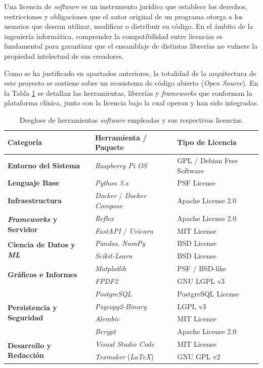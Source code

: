 Una licencia de \textit{software} es un instrumento jurídico que establece los derechos, restricciones y obligaciones que el autor original de un programa otorga a los usuarios que desean utilizar, modificar o distribuir su código. En el ámbito de la ingeniería informática, comprender la compatibilidad entre licencias es fundamental para garantizar que el ensamblaje de distintas librerías no vulnere la propiedad intelectual de sus creadores.

Como se ha justificado en apartados anteriores, la totalidad de la arquitectura de este proyecto se sostiene sobre un ecosistema de código abierto (\textit{Open Source}). En la Tabla \ref{tab:licencias_software} se detallan las herramientas, librerías y \textit{frameworks} que conforman la plataforma clínica, junto con la licencia bajo la cual operan y han sido integradas.

\begin{table}[hbt!]\centering\begin{tabular}{lll}
\hline
\textbf{Categoría} & \textbf{Herramienta / Paquete} & \textbf{Tipo de Licencia} \\ \hline
\textbf{Entorno del Sistema} & \textit{Raspberry Pi OS} & GPL / Debian Free Software \\ 
\textbf{Lenguaje Base} & \textit{Python 3.x} & PSF License \\ \hline
\textbf{Infraestructura} & \textit{Docker} / \textit{Docker Compose} & Apache License 2.0 \\ \hline
\multirow{2}{*}{\textbf{\textit{Frameworks} y Servidor}} & \textit{Reflex} & Apache License 2.0 \\
 & \textit{FastAPI} / \textit{Uvicorn} & MIT License \\ \hline
\multirow{2}{*}{\textbf{Ciencia de Datos y \textit{ML}}} & \textit{Pandas}, \textit{NumPy} & BSD License \\
 & \textit{Scikit-Learn} & BSD License \\ \hline
\multirow{2}{*}{\textbf{Gráficos e Informes}} & \textit{Matplotlib} & PSF / BSD-like \\
 & \textit{FPDF2} & GNU LGPL v3 \\ \hline
\multirow{4}{*}{\textbf{Persistencia y Seguridad}} & \textit{PostgreSQL} & PostgreSQL License \\
 & \textit{Psycopg2-Binary} & LGPL v3 \\
 & \textit{Alembic} & MIT License \\
 & \textit{Bcrypt} & Apache License 2.0 \\ \hline
\multirow{2}{*}{\textbf{Desarrollo y Redacción}} & \textit{Visual Studio Code} & MIT License \\
 & \textit{Texmaker} (\textit{LaTeX}) & GNU GPL v2 \\ \hline
\end{tabular}
\caption{Desglose de herramientas \textit{software} empleadas y sus respectivas licencias.}
\label{tab:licencias_software}
\end{table}

